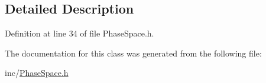\subsection{Detailed Description}


Definition at line 34 of file Phase\+Space.\+h.



The documentation for this class was generated from the following file\+:\begin{DoxyCompactItemize}
\item 
inc/\hyperlink{PhaseSpace_8h}{Phase\+Space.\+h}\end{DoxyCompactItemize}
